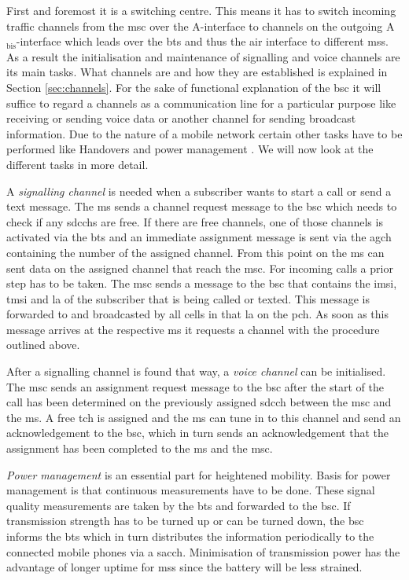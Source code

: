 First and foremost it is a switching centre.
This means it has to switch incoming traffic channels from the \gls{msc} over the A-interface to channels on the outgoing A$_\text{bis}$-interface which leads over the \gls{bts} and thus the air interface to different \glspl{ms}.
As a result the initialisation and maintenance of signalling and voice channels are its main tasks.
What channels are and how they are established is explained in Section \ref{sec:channels}.
For the sake of functional explanation of the \gls{bsc} it will suffice to regard a channels as a communication line for a particular purpose like receiving or sending voice data or another channel for sending broadcast information.
Due to the nature of a mobile network certain other tasks have to be performed like Handovers and power management \cite{kommsys2006}.
We will now look at the different tasks in more detail.

A \emph{signalling channel} is needed when a subscriber wants to start a call or send a text message.
The \gls{ms} sends a channel request message to the \gls{bsc} which needs to check if any \glspl{sdcch} are free.
If there are free channels, one of those channels is activated via the \gls{bts} and an immediate assignment message is sent via the \gls{agch} containing the number of the assigned channel.
From this point on the \gls{ms} can sent data on the assigned channel that reach the \gls{msc}.
For incoming calls a prior step has to be taken.
The \gls{msc} sends a message to the \gls{bsc} that contains the \gls{imsi}, \gls{tmsi} and \gls{la} of the subscriber that is being called or texted.
This message is forwarded to and broadcasted by all cells in that \gls{la} on the \gls{pch}.
As soon as this message arrives at the respective \gls{ms} it requests a channel with the procedure outlined above.

After a signalling channel is found that way, a \emph{voice channel} can be initialised.
The \gls{msc} sends an assignment request message to the \gls{bsc} after the start of the call has been determined on the previously assigned \gls{sdcch} between the \gls{msc} and the \gls{ms}.
A free \gls{tch} is assigned and the \gls{ms} can tune in to this channel and send an acknowledgement to the \gls{bsc}, which in turn sends an acknowledgement that the assignment has been completed to the \gls{ms} and the \gls{msc}.

\emph{Power management} is an essential part for heightened mobility.
Basis for power management is that continuous measurements have to be done.
These signal quality measurements are taken by the \gls{bts} and forwarded to the \gls{bsc}.
If transmission strength has to be turned up or can be turned down, the \gls{bsc} informs the \gls{bts} which in turn distributes the information periodically to the connected mobile phones via a \gls{sacch}.
Minimisation of transmission power has the advantage of longer uptime for \glspl{ms} since the battery will be less strained.

